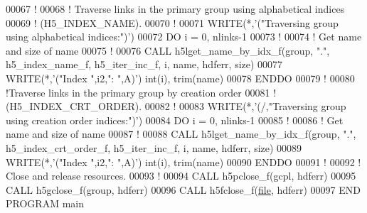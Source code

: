 \begin{DoxyCode}
00067   \textcolor{comment}{!}
00068   \textcolor{comment}{! Traverse links in the primary group using alphabetical indices}
00069   \textcolor{comment}{! (H5\_INDEX\_NAME).}
00070   \textcolor{comment}{!}
00071   \textcolor{keyword}{WRITE}(*,\textcolor{stringliteral}{'("Traversing group using alphabetical indices:")'})
00072   \textcolor{keywordflow}{DO} i = 0, nlinks-1
00073      \textcolor{comment}{!}
00074      \textcolor{comment}{! Get name and size of name}
00075      \textcolor{comment}{! }
00076      \textcolor{keyword}{CALL }h5lget\_name\_by\_idx\_f(group, \textcolor{stringliteral}{"."}, h5\_index\_name\_f, h5\_iter\_inc\_f, i, name, hdferr, size)
00077      \textcolor{keyword}{WRITE}(*,\textcolor{stringliteral}{'("Index ",i2,": ",A)'}) int(i), trim(name)
00078 \textcolor{keywordflow}{  ENDDO}
00079   \textcolor{comment}{!}
00080   \textcolor{comment}{!Traverse links in the primary group by creation order}
00081   \textcolor{comment}{! (H5\_INDEX\_CRT\_ORDER).}
00082   \textcolor{comment}{!}
00083   \textcolor{keyword}{WRITE}(*,\textcolor{stringliteral}{'(/,"Traversing group using creation order indices:")'})
00084   \textcolor{keywordflow}{DO} i = 0, nlinks-1
00085      \textcolor{comment}{!}
00086      \textcolor{comment}{! Get name and size of name}
00087      \textcolor{comment}{! }
00088      \textcolor{keyword}{CALL }h5lget\_name\_by\_idx\_f(group, \textcolor{stringliteral}{"."}, h5\_index\_crt\_order\_f, h5\_iter\_inc\_f, i, name, hdferr, size)
00089      \textcolor{keyword}{WRITE}(*,\textcolor{stringliteral}{'("Index ",i2,": ",A)'}) int(i), trim(name)
00090 \textcolor{keywordflow}{  ENDDO}
00091   \textcolor{comment}{!}
00092   \textcolor{comment}{! Close and release resources.}
00093   \textcolor{comment}{!}
00094   \textcolor{keyword}{CALL }h5pclose\_f(gcpl, hdferr)
00095   \textcolor{keyword}{CALL }h5gclose\_f(group, hdferr)
00096   \textcolor{keyword}{CALL }h5fclose\_f(\hyperlink{structfile}{file}, hdferr)
00097 \textcolor{keyword}{END PROGRAM }main
\end{DoxyCode}
